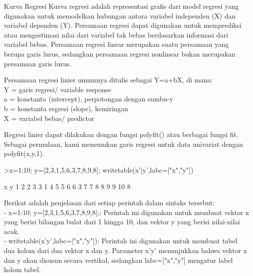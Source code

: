 \documentclass[a4paper,10pt]{article}
\begin{document}
\begin{eulernotebook}
\begin{eulercomment}
\begin{eulercomment}
\begin{eulercomment}
\begin{eulercomment}
\begin{eulercomment}
\begin{eulercomment}
\begin{eulercomment}
\begin{eulercomment}
\begin{eulercomment}
\begin{eulercomment}
\begin{eulercomment}
\begin{eulercomment}
\begin{eulercomment}
\begin{eulercomment}
\begin{eulercomment}
\begin{eulercomment}
\begin{eulercomment}
\end{eulercomment}
\eulersubheading{}
\begin{eulercomment}
Kurva Regresi 
Kurva regresi adalah representasi grafis dari model regresi yang
digunakan untuk memodelkan hubungan antara variabel independen (X) dan
variabel dependen (Y). Persamaan regresi dapat digunakan untuk
memprediksi atau mengestimasi nilai dari variabel tak bebas
berdasarkan informasi dari variabel bebas. Persamaan regresi linear
merupakan suatu persamaan yang berupa garis lurus, sedangkan persamaan
regresi nonlinear bukan merupakan persamaan garis lurus.

Persamaan regresi linier umumnya ditulis sebagai Y=a+bX, di mana: \\
Y = garis regresi/ variable response\\
a = konstanta (intercept), perpotongan dengan sumbu-y\\
b = konstanta regresi (slope), kemiringan\\
X = variabel bebas/ predictor

Regresi linier dapat dilakukan dengan fungsi polyfit() atau berbagai
fungsi fit. Sebagai permulaan, kami menemukan garis regresi untuk data
univariat dengan polyfit(x,y,1).

\end{eulercomment}
\begin{eulerprompt}
>x=1:10; y=[2,3,1,5,6,3,7,8,9,8]; writetable(x'|y',labc=["x","y"])
\end{eulerprompt}
\begin{euleroutput}
           x         y
           1         2
           2         3
           3         1
           4         5
           5         6
           6         3
           7         7
           8         8
           9         9
          10         8
\end{euleroutput}
\begin{eulercomment}
Berikut adalah penjelasan dari setiap perintah dalam sintaks tersebut:\\
- x=1:10; y=[2,3,1,5,6,3,7,8,9,8];: Perintah ini digunakan untuk
membuat vektor x yang berisi bilangan bulat dari 1 hingga 10, dan
vektor y yang berisi nilai-nilai acak.\\
- writetable(x'\textbar{}y',labc=["x","y"]): Perintah ini digunakan untuk
membuat tabel dua kolom dari dua vektor x dan y. Parameter x'\textbar{}y'
menunjukkan bahwa vektor x dan y akan disusun secara vertikal,
sedangkan labc=["x","y"] mengatur label kolom tabel.


\end{eulercomment}
\end{eulercomment}
\end{eulercomment}
\end{eulercomment}
\end{eulercomment}
\end{eulercomment}
\end{eulercomment}
\end{eulercomment}
\end{eulercomment}
\end{eulercomment}
\end{eulercomment}
\end{eulercomment}
\end{eulercomment}
\end{eulercomment}
\end{eulercomment}
\end{eulercomment}
\end{eulercomment}
\end{eulernotebook}
\end{document}
